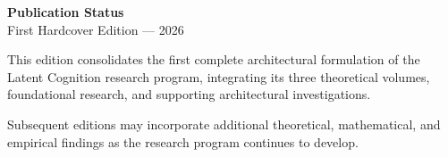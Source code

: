 \thispagestyle{empty}
\null\vfill
\noindent\textbf{Publication Status}\\
First Hardcover Edition --- 2026\par
\vspace{0.20in}
\noindent This edition consolidates the first complete architectural
formulation of the Latent Cognition research program, integrating
its three theoretical volumes, foundational research, and supporting
architectural investigations.\par
\vspace{\baselineskip}
\noindent Subsequent editions may incorporate additional theoretical,
mathematical, and empirical findings as the research program
continues to develop.\par
\vfill
\clearpage

